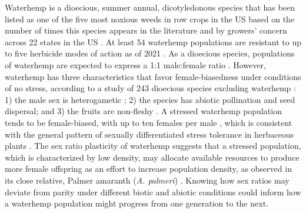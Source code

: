 \documentclass[
]{article}
\begin{document}
Waterhemp is a dioecious, summer annual, dicotyledonous species that has been listed as one of the five most noxious weeds in row crops in the US based on the number of times this species appears in the literature \citep{johnsonInfluenceGlyphosateresistantCropping2009} and by growers' concern across 22 states in the US \citep{princeBenchmarkStudyIV2012}. At least 54 waterhemp populations are resistant to up to five herbicide modes of action as of 2021 \citep{heapHerbicideResistantTall2021}. As a dioecious species, populations of waterhemp are expected to express a 1:1 male:female ratio \citep{grantCytogeneticStudiesAmaranthus1959, costeaBiologyInvasiveAlien2005, heneghanGrowthDevelopmentFive2017}. However, waterhemp has three characteristics that favor female-biasedness under conditions of no stress, according to a study of 243 dioecious species excluding waterhemp \citep{fieldComparativeAnalysesSexratio2013}: 1) the male sex is heterogametic \citep{montgomeryMaleSpecificChromosomal2021}; 2) the species has abiotic pollination and seed dispersal; and 3) the fruits are non-fleshy \citep{costeaBiologyInvasiveAlien2005}. A stressed waterhemp population tends to be female-biased, with up to ten females per male \citep{prattAmaranthusRudisTuberculatus2001}, which is consistent with the general pattern of sexually differentiated stress tolerance in herbaceous plants \citep[38 species, excluding waterhemp,][]{juvanySexrelatedDifferencesStress2015}. The sex ratio plasticity of waterhemp suggests that a stressed population, which is characterized by low density, may allocate available resources to produce more female offspring as an effort to increase population density, as observed in its close relative, Palmer amaranth (\emph{A. palmeri}) \citep{korresPalmerAmaranthAmaranthus2017, mesgaranSexLabilityDimorphism2019}. Knowing how sex ratios may deviate from parity under different biotic and abiotic conditions could inform how a waterhemp population might progress from one generation to the next.
\end{document}
